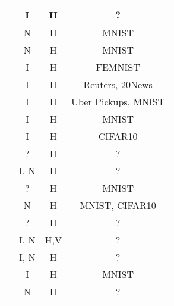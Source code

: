 \begin{table}[htp]
\begin{tabular}{c|c|c|c}
\cite{8733825}                      & I                 & H              & ?                                  \\ \hline
\cite{8893114}                      & N                 & H              & MNIST                              \\ \hline
\cite{9274451}                      & N                 & H              & MNIST                              \\ \hline
\cite{9293091}                      & I                 & H              & FEMNIST                            \\ \hline
\cite{8843900}                      & I                 & H              & Reuters, 20News                    \\ \hline
\cite{8998397}                      & I                 & H              & Uber Pickups, MNIST                \\ \hline
\cite{9311394}                      & I                 & H              & MNIST                              \\ \hline
\cite{9170905}                      & I                 & H              & CIFAR10                            \\ \hline
\cite{10.48550/arxiv.2009.09338}    & ?                 & H              & ?                                  \\ \hline
\cite{8892848}                      & I, N              & H              & ?                                  \\ \hline
\cite{8945913}                      & ?                 & H              & MNIST                              \\ \hline
\cite{10.48550/arxiv.2202.02817}    & N                 & H              & MNIST, CIFAR10                     \\ \hline
\cite{10.48550/arxiv.2007.03856}    & ?                 & H              & ?                                  \\ \hline
\cite{10.48550/arxiv.1912.04859}    & I, N              & H,V            & ?                                  \\ \hline
\cite{10.48550/arxiv.1910.12603}    & I, N              & H              & ?                                  \\ \hline
\cite{9321132}                      & I                 & H              & MNIST                              \\ \hline
\cite{Peyvandi2022}                 & N                 & H              & ?                                  \\ \hline

\end{tabular}
\end{table}
